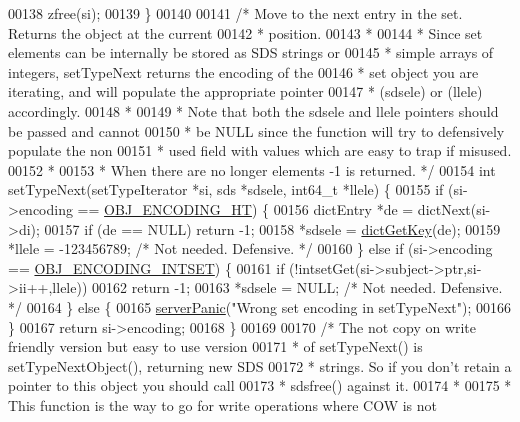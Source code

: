 \begin{DoxyCode}
00138     zfree(si);
00139 \}
00140 
00141 \textcolor{comment}{/* Move to the next entry in the set. Returns the object at the current}
00142 \textcolor{comment}{ * position.}
00143 \textcolor{comment}{ *}
00144 \textcolor{comment}{ * Since set elements can be internally be stored as SDS strings or}
00145 \textcolor{comment}{ * simple arrays of integers, setTypeNext returns the encoding of the}
00146 \textcolor{comment}{ * set object you are iterating, and will populate the appropriate pointer}
00147 \textcolor{comment}{ * (sdsele) or (llele) accordingly.}
00148 \textcolor{comment}{ *}
00149 \textcolor{comment}{ * Note that both the sdsele and llele pointers should be passed and cannot}
00150 \textcolor{comment}{ * be NULL since the function will try to defensively populate the non}
00151 \textcolor{comment}{ * used field with values which are easy to trap if misused.}
00152 \textcolor{comment}{ *}
00153 \textcolor{comment}{ * When there are no longer elements -1 is returned. */}
00154 \textcolor{keywordtype}{int} setTypeNext(setTypeIterator *si, sds *sdsele, int64\_t *llele) \{
00155     \textcolor{keywordflow}{if} (si->encoding == \hyperlink{server_8h_a9c10219f68afc557d510d108257d238b}{OBJ\_ENCODING\_HT}) \{
00156         dictEntry *de = dictNext(si->di);
00157         \textcolor{keywordflow}{if} (de == NULL) \textcolor{keywordflow}{return} -1;
00158         *sdsele = \hyperlink{dict_8h_a3271c334309904a3086deca94f96e46e}{dictGetKey}(de);
00159         *llele = -123456789; \textcolor{comment}{/* Not needed. Defensive. */}
00160     \} \textcolor{keywordflow}{else} \textcolor{keywordflow}{if} (si->encoding == \hyperlink{server_8h_a214173987de21c3b7661fddd42b05873}{OBJ\_ENCODING\_INTSET}) \{
00161         \textcolor{keywordflow}{if} (!intsetGet(si->subject->ptr,si->ii++,llele))
00162             \textcolor{keywordflow}{return} -1;
00163         *sdsele = NULL; \textcolor{comment}{/* Not needed. Defensive. */}
00164     \} \textcolor{keywordflow}{else} \{
00165         \hyperlink{server_8h_a11cc378e7778a830b41240578de3b204}{serverPanic}(\textcolor{stringliteral}{"Wrong set encoding in setTypeNext"});
00166     \}
00167     \textcolor{keywordflow}{return} si->encoding;
00168 \}
00169 
00170 \textcolor{comment}{/* The not copy on write friendly version but easy to use version}
00171 \textcolor{comment}{ * of setTypeNext() is setTypeNextObject(), returning new SDS}
00172 \textcolor{comment}{ * strings. So if you don't retain a pointer to this object you should call}
00173 \textcolor{comment}{ * sdsfree() against it.}
00174 \textcolor{comment}{ *}
00175 \textcolor{comment}{ * This function is the way to go for write operations where COW is not}

\end{DoxyCode}
